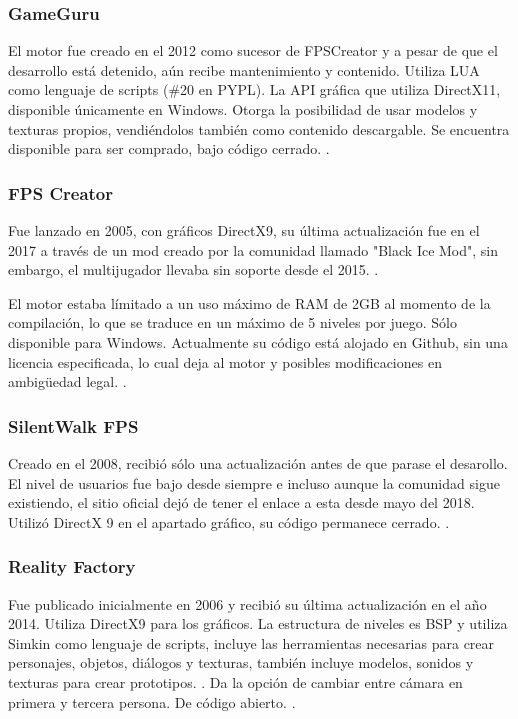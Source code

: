 \documentclass[]{article}
\begin{document}
\subsubsection{GameGuru}

El motor fue creado en el 2012 como sucesor de FPSCreator y a pesar de que el desarrollo est\'a detenido, a\'un recibe mantenimiento y contenido. 
Utiliza LUA como lenguaje de scripts (\#20 en PYPL).
La API gr\'afica que utiliza DirectX11, disponible únicamente en Windows. Otorga la posibilidad de usar modelos y texturas propios, vendi\'endolos tambi\'en como contenido descargable. Se encuentra disponible para ser comprado, bajo c\'odigo cerrado. \cite{game_guru}.

\subsubsection{FPS Creator}

Fue lanzado en 2005, con gr\'aficos DirectX9, su \'ultima actualizaci\'on fue en el 2017 a trav\'es de un mod creado por la comunidad llamado "Black Ice Mod", sin embargo, el multijugador llevaba sin soporte desde el 2015. \cite{MP_discontinued}.

El motor estaba l\'imitado a un uso m\'aximo de RAM de 2GB al momento de la compilaci\'on, lo que se traduce en un m\'aximo de 5 niveles por juego.
S\'olo disponible para Windows.
Actualmente su c\'odigo est\'a alojado en Github, sin una licencia especificada, lo cual deja al motor y posibles modificaciones en ambig\"uedad legal. \cite{FPSCReator}.


\subsubsection{SilentWalk FPS}

Creado en el 2008, recibi\'o s\'olo una actualizaci\'on antes de que parase el desarollo. El nivel de usuarios fue bajo desde siempre e incluso aunque la comunidad sigue existiendo, el sitio oficial dej\'o de tener el enlace a esta desde mayo del 2018. 
Utiliz\'o DirectX 9 en el apartado gr\'afico, su c\'odigo permanece cerrado. \cite{Silentwalk}.

\subsubsection{Reality Factory}

Fue publicado inicialmente en 2006 y recibi\'o su \'ultima actualizaci\'on en el a\~no 2014. Utiliza DirectX9 para los gr\'aficos. La estructura de niveles es BSP y utiliza Simkin como lenguaje de scripts, incluye las herramientas necesarias para crear personajes, objetos, di\'alogos y texturas, tambi\'en incluye modelos, sonidos y texturas para crear prototipos. \cite{features}. Da la opci\'on de cambiar entre c\'amara en primera y tercera persona. De c\'odigo abierto. \cite{overview}.
\end{document}
